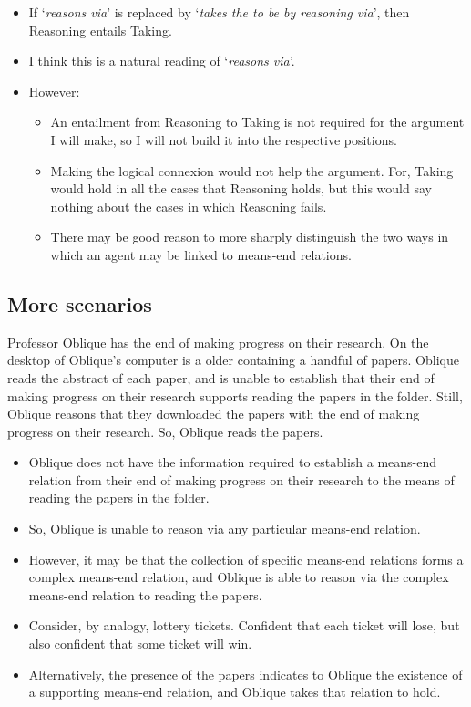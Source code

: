 \documentclass[10pt]{article}
\newcommand{\schemaName}[1]{\textsf{#1}}
\begin{document}
\begin{itemize}
\item If `\emph{reasons via}' is replaced by `\emph{takes the to be by reasoning via}', then \schemaName{Reasoning} entails \schemaName{Taking}.
\item I think this is a natural reading of `\emph{reasons via}'.
\item However:
  \begin{itemize}
  \item An entailment from \schemaName{Reasoning} to \schemaName{Taking} is not required for the argument I will make, so I will not build it into the respective positions.
  \item Making the logical connexion would not help the argument. For, \schemaName{Taking} would hold in all the cases that \schemaName{Reasoning} holds, but this would say nothing about the cases in which \schemaName{Reasoning} fails.
  \item There may be good reason to more sharply distinguish the two ways in which an agent may be linked to means-end relations.
  \end{itemize}
\end{itemize}

\subsection{More scenarios}
\label{sec:more-scenarios}


\begin{scenario}
  Professor Oblique has the end of making progress on their research.
  On the desktop of Oblique's computer is a older containing a handful of papers.
  Oblique reads the abstract of each paper, and is unable to establish that their end of making progress on their research supports reading the papers in the folder.
  Still, Oblique reasons that they downloaded the papers with the end of making progress on their research.
  So, Oblique reads the papers.
\end{scenario}

\begin{itemize}[noitemsep]
\item Oblique does not have the information required to establish a means-end relation from their end of making progress on their research to the means of reading the papers in the folder.
\item So, Oblique is unable to reason via any particular means-end relation.
\item However, it may be that the collection of specific means-end relations forms a complex means-end relation, and Oblique is able to reason via the complex means-end relation to reading the papers.
\item Consider, by analogy, lottery tickets.
  Confident that each ticket will lose, but also confident that some ticket will win.
\item Alternatively, the presence of the papers indicates to Oblique the existence of a supporting means-end relation, and Oblique takes that relation to hold.
\end{itemize}
\end{document}
